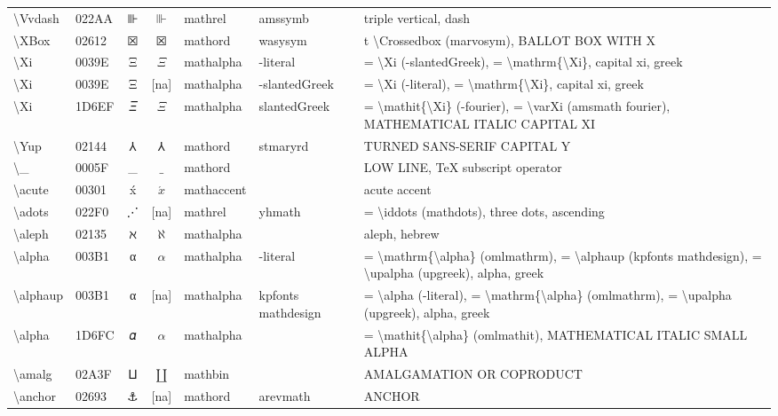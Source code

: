\documentclass[a4paper,landscape]{article}
\begin{document}
\begin{longtable}{llcclll}
\textbackslash{}Vvdash & 022AA & ⊪ & $\Vvdash$ & mathrel & amssymb & triple vertical, dash \\
\textbackslash{}XBox & 02612 & ☒ & $\XBox$ & mathord & wasysym & t \textbackslash{}Crossedbox (marvosym), BALLOT BOX WITH X \\
\textbackslash{}Xi & 0039E & Ξ & $\Xi$ & mathalpha & -literal & = \textbackslash{}Xi (-slantedGreek), = \textbackslash{}mathrm\{\textbackslash{}Xi\}, capital xi, greek \\
\textbackslash{}Xi & 0039E & Ξ & [na] & mathalpha & -slantedGreek & = \textbackslash{}Xi (-literal),  = \textbackslash{}mathrm\{\textbackslash{}Xi\},  capital xi,  greek \\
\textbackslash{}Xi & 1D6EF & 𝛯 & $\Xi$ & mathalpha & slantedGreek & = \textbackslash{}mathit\{\textbackslash{}Xi\} (-fourier), = \textbackslash{}varXi (amsmath fourier), MATHEMATICAL ITALIC CAPITAL XI \\
\textbackslash{}Yup & 02144 & ⅄ & $\Yup$ & mathord & stmaryrd & TURNED SANS-SERIF CAPITAL Y \\
\textbackslash{}\_ & 0005F & \_ & $\_$ & mathord &  & LOW LINE, TeX subscript operator \\
\textbackslash{}acute & 00301 & x́ & $\acute{x}$ & mathaccent &  & acute accent \\
\textbackslash{}adots & 022F0 & ⋰ & [na] & mathrel & yhmath & = \textbackslash{}iddots (mathdots),  three dots,  ascending \\
\textbackslash{}aleph & 02135 & ℵ & $\aleph$ & mathalpha &  & aleph, hebrew \\
\textbackslash{}alpha & 003B1 & α & $\alpha$ & mathalpha & -literal & = \textbackslash{}mathrm\{\textbackslash{}alpha\} (omlmathrm), = \textbackslash{}alphaup (kpfonts mathdesign), = \textbackslash{}upalpha (upgreek), alpha, greek \\
\textbackslash{}alphaup & 003B1 & α & [na] & mathalpha & kpfonts mathdesign & = \textbackslash{}alpha (-literal), = \textbackslash{}mathrm\{\textbackslash{}alpha\} (omlmathrm),  = \textbackslash{}upalpha (upgreek),  alpha,  greek \\
\textbackslash{}alpha & 1D6FC & 𝛼 & $\alpha$ & mathalpha &  & = \textbackslash{}mathit\{\textbackslash{}alpha\} (omlmathit), MATHEMATICAL ITALIC SMALL ALPHA \\
\textbackslash{}amalg & 02A3F & ⨿ & $\amalg$ & mathbin &  & AMALGAMATION OR COPRODUCT \\
\textbackslash{}anchor & 02693 & ⚓ & [na] & mathord & arevmath & ANCHOR \\

\end{longtable}
\end{document}
